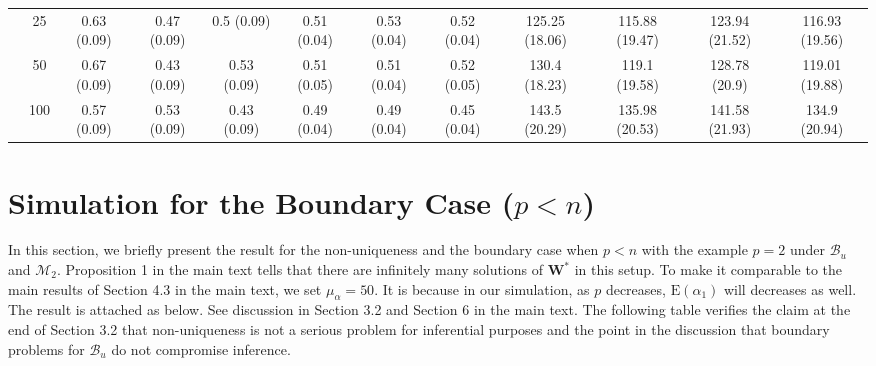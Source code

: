 \documentclass[11pt]{article}
\def\mbf#1{\mathbf{#1}} %
\def\mc#1{\mathcal{#1}} %
\def\E#1{\mathrm{E}(#1)} %
\theoremstyle{definition}
\begin{document}
\begin{landscape}
\begin{table}[b]
\begin{center}
{\begin{tabular}{cc|ccc|ccc|cccc|}
  & 25  & 0.63 (0.09) & 0.47 (0.09) & 0.5 (0.09) & 0.51 (0.04) & 0.53 (0.04) & 0.52 (0.04) & 125.25 (18.06) & 115.88 (19.47) & 123.94 (21.52) & 116.93 (19.56) \\ 
  & 50  & 0.67 (0.09) & 0.43 (0.09) & 0.53 (0.09) & 0.51 (0.05) & 0.51 (0.04) & 0.52 (0.05) & 130.4 (18.23) & 119.1 (19.58) & 128.78 (20.9) & 119.01 (19.88) \\ 
  & 100  & 0.57 (0.09) & 0.53 (0.09) & 0.43 (0.09) & 0.49 (0.04) & 0.49 (0.04) & 0.45 (0.04) & 143.5 (20.29) & 135.98 (20.53) & 141.58 (21.93) & 134.9 (20.94) \\ 
\end{tabular}}
   \end{center}
\end{table}
\end{landscape}

\section{Simulation for the Boundary Case ($p < n$)}

\label{boundary}

In this section, we briefly present the result for the non-uniqueness and the boundary case when $p < n$ with the example $p = 2$ under $\mc{B}_u$ and $\mc{M}_2$. Proposition 1 in the main text tells that there are infinitely many solutions of $\mbf{W}^*$ in this setup. To make it comparable to the main results of Section 4.3 in the main text, we set $\mu_{\alpha}=50$. It is because in our simulation, as $p$ decreases, $\E{\alpha_1}$ will decreases as well. The result is attached as below. See discussion in  Section 3.2 and Section 6 in the main text. The following table verifies the claim  at the end of Section 3.2 that non-uniqueness is not a serious problem for inferential purposes and the point in the discussion that boundary problems for $\mc{B}_u$ do not  compromise inference.
\end{document}
